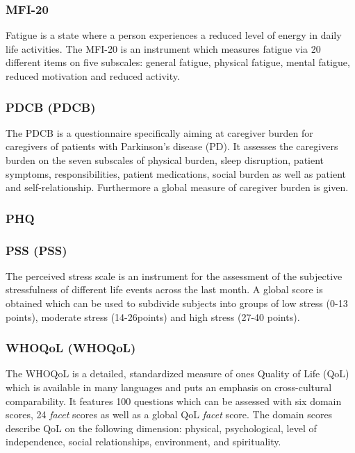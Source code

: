 \subsubsection{\acl{MFI-20}}
Fatigue is a state where a person experiences a reduced level of energy in daily life activities. The \ac{MFI-20} is an instrument which measures fatigue via 20 different items on five subscales: general fatigue, physical fatigue, mental fatigue, reduced motivation and reduced activity.

\subsubsection{\acl{PDCB} (\acs{PDCB})}
The \ac{PDCB} is a questionnaire specifically aiming at caregiver burden for caregivers of patients with Parkinson's disease (PD). It assesses the caregivers burden on the seven subscales of physical burden, sleep disruption, patient symptoms, responsibilities, patient medications, social burden as well as patient and self-relationship. Furthermore a global measure of caregiver burden is given. 

\subsubsection{\acl{PHQ}}

\subsubsection{\acl{PSS} (\acs{PSS})}
The perceived stress scale is an instrument for the assessment of the subjective stressfulness of different life events across the last month. A global score is obtained which can be used to subdivide subjects into groups of low stress (0-13 points), moderate stress (14-26points) and high stress (27-40 points).

\subsubsection{\acl{WHOQoL} (\acs{WHOQoL})}
The \ac{WHOQoL} is a detailed, standardized measure of ones Quality of Life (QoL) which is available in many languages and puts an emphasis on cross-cultural comparability. It features 100 questions which can be assessed with six domain scores, 24 \emph{facet} scores as well as a global QoL \emph{facet} score. The domain scores describe QoL on the following dimension: physical, psychological, level of independence, social relationships, environment, and spirituality.

